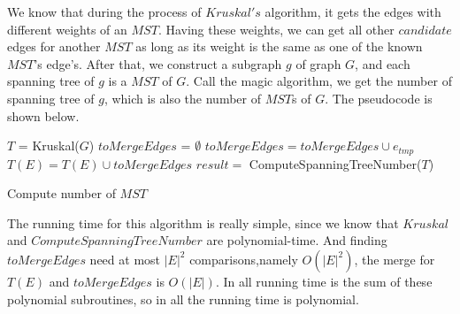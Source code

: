 \documentclass[UTF8]{ctexart}
\begin{document}
    We know that during the process of $Kruskal's$ algorithm, it gets the edges with different weights
    of an $MST$. Having these weights, we can get all other $candidate$ edges for another $MST$ as long 
    as its weight is the same as one of the known $MST$'s edge's. After that, we construct a subgraph $g$
    of graph $G$, and each spanning tree of $g$ is a $MST$ of $G$. Call the magic algorithm, we get the number
    of spanning tree of $g$, which is also the number of $MST$s of $G$. The pseudocode is shown below.

    \begin{algorithm}[H]
        $T$ = Kruskal($G$)\;
        $toMergeEdges$ = $ \emptyset$ \; 
         {
             {
                 {
                    $toMergeEdges = toMergeEdges \cup e_{tmp}$\;
                }
            }
        }
        $T(E) = T(E) \cup toMergeEdges $\;
        $result = $ ComputeSpanningTreeNumber($T$)\;
        \caption{Compute number of $MST$}
    \end{algorithm}
    
    The running time for this algorithm is really simple, since we know that $Kruskal$ and $ComputeSpanningTreeNumber$
    are polynomial-time. And finding $toMergeEdges$ need at most $|E|^2$ comparisons,namely $O(|E|^2)$, the merge for $T(E)$ and $toMergeEdges$
    is $O(|E|)$. In all running time is the sum of these polynomial subroutines, so in all the running time is polynomial.
\end{document}
